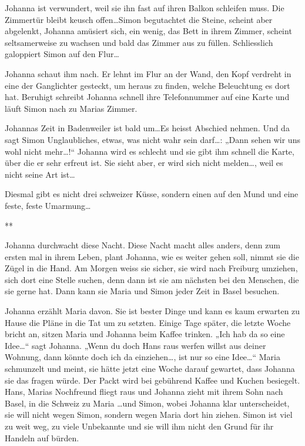 \documentclass[10pt,titlepage,a5paper]{book}
\newcommand{\sterne}{\par{\centering ***\par}}
\begin{document}
Johanna ist verwundert, weil sie ihn fast auf ihren Balkon schleifen muss. Die Zimmertür bleibt keusch offen\dots  Simon begutachtet die Steine, scheint aber abgelenkt, Johanna amüsiert sich, ein wenig, das Bett in ihrem Zimmer, scheint seltsamerweise zu wachsen und bald das Zimmer aus zu füllen. Schliesslich galoppiert Simon auf den Flur\dots 

 Johanna schaut ihm nach. Er lehnt im Flur an der Wand, den Kopf verdreht in eine der Ganglichter gesteckt, um heraus zu finden, welche Beleuchtung es dort hat. Beruhigt schreibt Johanna schnell ihre Telefonnummer auf eine Karte und läuft Simon nach zu Marias Zimmer.
 
Johannas Zeit in Badenweiler  ist bald um\dots  Es heisst Abschied nehmen. Und da sagt Simon Unglaubliches, etwas, was nicht wahr sein darf\dots : „Dann sehen wir uns wohl nicht mehr\dots !“  Johanna wird es schlecht und sie gibt ihm schnell die Karte, über die er sehr erfreut ist. Sie sieht aber, er wird sich nicht melden\dots , weil es nicht seine Art ist\dots 

Diesmal gibt es nicht drei schweizer Küsse, sondern einen auf den Mund und eine feste, feste Umarmung\dots 

\sterne

Johanna durchwacht diese Nacht. Diese Nacht macht alles anders, denn zum ersten mal in ihrem Leben, plant Johanna, wie es weiter gehen soll, nimmt sie die Zügel in die Hand. Am Morgen weiss sie sicher, sie wird nach Freiburg umziehen, sich dort eine Stelle suchen, denn dann ist sie am nächsten bei den Menschen, die sie gerne hat. Dann kann sie Maria und Simon  jeder Zeit in Basel besuchen.

Johanna erzählt Maria davon. Sie ist bester Dinge und kann es kaum erwarten zu Hause die Pläne in die Tat um zu setzten. Einige Tage später, die letzte Woche bricht an, sitzen Maria und Johanna beim Kaffee trinken. „Ich hab da so eine Idee\dots “ sagt Johanna. „Wenn du doch Hans raus werfen willst aus deiner Wohnung, dann könnte doch ich da einziehen\dots , ist nur so eine Idee\dots “ Maria schmunzelt und meint, sie hätte jetzt eine Woche darauf gewartet, dass Johanna sie das fragen würde. Der Packt wird bei gebührend Kaffee und Kuchen besiegelt. Hans, Marias Nochfreund fliegt raus und Johanna zieht mit ihrem Sohn nach Basel, in die Schweiz zu Maria \dots und Simon, wobei Johanna klar unterscheidet, sie will nicht wegen Simon, sondern wegen Maria dort hin ziehen. Simon ist viel zu weit weg, zu viele Unbekannte und sie will ihm nicht den Grund für ihr Handeln auf bürden.
\end{document}
